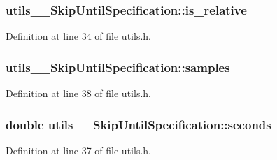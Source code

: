 \subsubsection[{\texorpdfstring{is\+\_\+relative}{is_relative}}]{ utils\+\_\+\+\_\+\+Skip\+Until\+Specification\+::is\+\_\+relative}\hypertarget{structutils_____skip_until_specification_a6a5f7a64c7161adb11b74cb38659ea8e}{}\label{structutils_____skip_until_specification_a6a5f7a64c7161adb11b74cb38659ea8e}


Definition at line 34 of file utils.\+h.

\subsubsection[{\texorpdfstring{samples}{samples}}]{ utils\+\_\+\+\_\+\+Skip\+Until\+Specification\+::samples}\hypertarget{structutils_____skip_until_specification_a0c5dce92c478d9d456c163d497e64edf}{}\label{structutils_____skip_until_specification_a0c5dce92c478d9d456c163d497e64edf}


Definition at line 38 of file utils.\+h.

\subsubsection[{\texorpdfstring{seconds}{seconds}}]{\setlength{\rightskip}{0pt plus 5cm}double utils\+\_\+\+\_\+\+Skip\+Until\+Specification\+::seconds}\hypertarget{structutils_____skip_until_specification_af2cce424e1d89a678b796fb6d5776fdc}{}\label{structutils_____skip_until_specification_af2cce424e1d89a678b796fb6d5776fdc}


Definition at line 37 of file utils.\+h.

